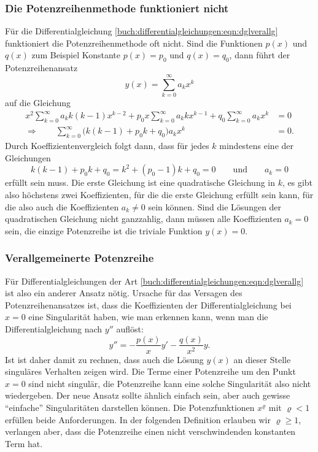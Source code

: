 \subsubsection{Die Potenzreihenmethode funktioniert nicht}
Für die Differentialgleichung
\eqref{buch:differentialgleichungen:eqn:dglverallg}
funktioniert die Potenzreihenmethode oft nicht.
Sind die Funktionen $p(x)$ und $q(x)$ zum Beispiel Konstante 
$p(x)=p_0$ und $q(x)=q_0$, dann führt der Potenzreihenansatz
\[
y(x) = \sum_{k=0}^\infty a_kx^k
\]
auf die Gleichung
\begin{align*}
x^2\sum_{k=0}^\infty a_kk(k-1)x^{k-2}
+
p_0x\sum_{k=0}^\infty a_kkx^{k-1}
+
q_0\sum_{k=0}^\infty a_kx^k
&=
0
\\
\Rightarrow\qquad
\sum_{k=0}^\infty\bigl(
k(k-1)
+
p_0k
+
q_0
\bigr)a_kx^k
&=
0.
\end{align*}
Durch Koeffizientenvergleich folgt dann, dass für jedes $k$ mindestens
eine der Gleichungen
\[
k(k-1) +p_0k +q_0 = k^2 + (p_0-1)k +q_0 = 0
\qquad\text{und}\qquad
a_k=0
\]
erfüllt sein muss.
Die erste Gleichung ist eine quadratische Gleichung in $k$, es gibt also
höchstens zwei Koeffizienten, für die die erste Gleichung erfüllt sein
kann, für die also auch die Koeffizienten $a_k\ne 0$ sein können.
Sind die Lösungen der quadratischen Gleichung nicht ganzzahlig,
dann müssen alle Koeffizienten 
$a_k=0$ sein, die einzige Potenzreihe ist die triviale Funktion $y(x)=0$.

%
%
\subsubsection{Verallgemeinerte Potenzreihe}
Für Differentialgleichungen der Art
\eqref{buch:differentialgleichungen:eqn:dglverallg}
ist also ein anderer Ansatz nötig.
Ursache für das Versagen des Potenzreihenansatzes ist, dass die
Koeffizienten der Differentialgleichung bei $x=0$ eine
Singularität haben, wie man erkennen kann, wenn man die
Differentialgleichung nach $y''$ auflöst:
\[
y'' = -\frac{p(x)}{x}y' - \frac{q(x)}{x^2}y.
\]
Ist ist daher damit zu rechnen, dass auch die Lösung $y(x)$ an dieser
Stelle singuläres Verhalten zeigen wird.
Die Terme einer Potenzreihe um den Punkt $x=0$ sind nicht singulär,
die Potenzreihe kann eine solche Singularität also nicht wiedergeben.
Der neue Ansatz sollte ähnlich einfach sein, aber auch gewisse ``einfache''
Singularitäten darstellen können.
Die Potenzfunktionen $x^\varrho$ mit $\varrho<1$ erfüllen beide
Anforderungen.
In der folgenden Definition erlauben wir $\varrho \ge 1$, verlangen
aber, dass die Potenzreihe einen nicht verschwindenden konstanten Term hat.

